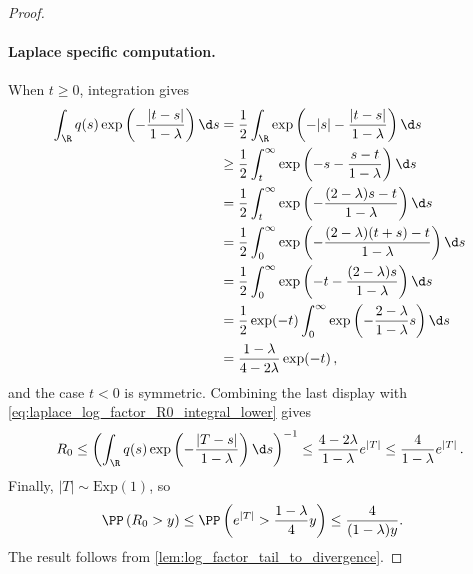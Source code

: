 \begin{proof}
    \paragraph{Laplace specific computation.}
    When $t\ge0$, integration gives
    \begin{align}
        \int_\R
        q(s)
        \exp\left(
        -\frac{|t-s|}{1-\lambda}
        \right)
        \d s
         & =
        \frac{1}{2}
        \int_\R
        \exp\left(
        -|s|
        -\frac{|t-s|}{1-\lambda}
        \right)
        \d s    \\
         & \geq
        \frac{1}{2}
        \int_t^\infty
        \exp\left(
        -s
        -\frac{s-t}{1-\lambda}
        \right)
        \d s    \\
         & =
        \frac{1}{2}
        \int_t^{\infty}
        \exp\left(
        -\frac{(2- \lambda) s - t}{1-\lambda}
        \right)
        \d s
        \\
         & =
        \frac{1}{2}
        \int_{0}^\infty
        \exp\left(
        -\frac{(2 - \lambda) (t+s) - t}{1-\lambda}
        \right)
        \d s
        \\
         & =
        \frac{1}{2}
        \int_{0}^\infty
        \exp\left(
        -t - \frac{(2-\lambda)s}{1-\lambda}
        \right)
        \d s
        \\
         & =
        \frac{1}{2}
        \exp(-t)
        \int_{0}^\infty
        \exp\left(
        - \frac{2-\lambda}{1-\lambda} s
        \right)
        \d s
        \\
         & =
        \frac{1-\lambda}{4-2\lambda}
        \exp(-t)\,,
    \end{align}
    and the case $t<0$ is symmetric.
    Combining the last display with \cref{eq:laplace_log_factor_R0_integral_lower} gives
    \begin{align}
        R_0
        \le
        \left(
        \int_\R q(s) \exp\left(- \frac{|T-s|}{1-\lambda}\right) \d s
        \right)^{-1}
        \le
        \frac{4-2\lambda}{1-\lambda}e^{|T|}
        \le
        \frac{4}{1-\lambda}e^{|T|}
        \,.
        \label{eq:laplace_log_factor_R0_exp_upper}
    \end{align}
    Finally, $|T|\sim\mathrm{Exp}(1)$, so
    \begin{align}
        \PP\left(R_0>y\right)
         & \le
        \PP\left(e^{|T|}>\frac{1-\lambda}{4}y\right)\le \frac{4}{(1-\lambda)y}.
    \end{align}
    The result follows from \cref{lem:log_factor_tail_to_divergence}.
\end{proof}

